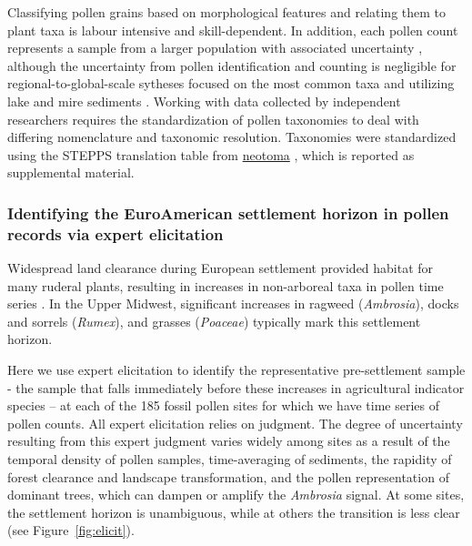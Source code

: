 \documentclass[12pt]{article}
\begin{document}
Classifying pollen grains based on morphological features and relating
them to plant taxa is labour intensive and skill-dependent. In
addition, each pollen count represents a sample from a larger
population with associated uncertainty \citep{maher2012assessment,
  maher1981statistics}, although the uncertainty from pollen
identification and counting is negligible for regional-to-global-scale
sytheses focused on the most common taxa and utilizing lake and mire
sediments \citep{webb1978sensing, webb1978mapped}. Working with data
collected by independent researchers requires the standardization of
pollen taxonomies to deal with differing nomenclature and taxonomic
resolution. Taxonomies were standardized using the STEPPS translation
table from \url{neotoma} \citep{goring}, which is reported as
supplemental material.

\subsubsection{Identifying the EuroAmerican settlement horizon in pollen records via expert elicitation}

Widespread land clearance during European settlement provided habitat
for many ruderal plants, resulting in increases in non-arboreal taxa
in pollen time series  \citep{mcandrews1988human}. In the Upper Midwest,
significant increases in ragweed (\textit{Ambrosia}), docks and
sorrels (\textit{Rumex}), and grasses (\textit{Poaceae}) typically
mark this settlement horizon.

Here we use expert elicitation to identify the representative
pre-settlement sample - the sample that falls immediately before these
increases in agricultural indicator species -- at each of the 185
fossil pollen sites for which we have time series of pollen
counts. All expert elicitation relies on judgment. The degree of
uncertainty resulting from this expert judgment varies widely among
sites as a result of the temporal density of pollen samples,
time-averaging of sediments, the rapidity of forest clearance and
landscape transformation, and the pollen representation of dominant
trees, which can dampen or amplify the \textit{Ambrosia} signal. At
some sites, the settlement horizon is unambiguous, while at others the
transition is less clear (see Figure~\ref{fig:elicit}).
\end{document}
